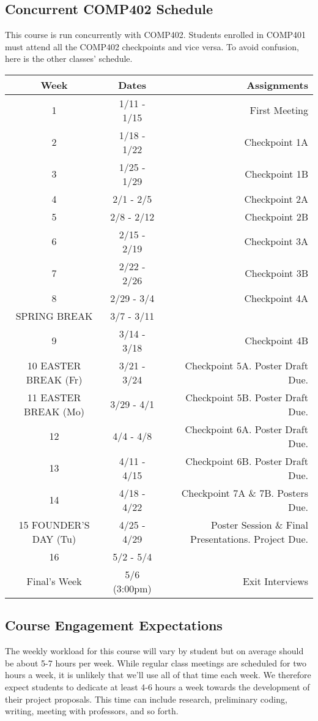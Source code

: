 \documentclass[10pt]{article}
\begin{document}
\subsection{Concurrent COMP402 Schedule}

This course is run concurrently with COMP402. Students enrolled in COMP401 must attend all the COMP402 checkpoints and vice versa. To avoid confusion, here is the other classes' schedule.

\begin{center}
\begin{tabular}{|c|c|r|}
\hline 
Week & Dates & Assignments \\
\hline
1 & 1/11 - 1/15 &  First Meeting\\
\hline
2 & 1/18 - 1/22 & Checkpoint 1A \\
\hline
3 & 1/25 - 1/29 & Checkpoint 1B  \\
\hline
4 & 2/1 - 2/5 & Checkpoint 2A  \\
\hline
5 & 2/8 - 2/12 & Checkpoint 2B  \\
\hline
6 & 2/15 - 2/19 & Checkpoint 3A \\
\hline
7 & 2/22 - 2/26 & Checkpoint 3B  \\
\hline
8 & 2/29 - 3/4 &  Checkpoint 4A  \\
\hline 
SPRING BREAK & 3/7 - 3/11 &  \\
\hline
9 & 3/14 - 3/18 & Checkpoint 4B \\
\hline
10 EASTER BREAK (Fr)& 3/21 - 3/24 & Checkpoint 5A. Poster Draft Due.\\
\hline
11 EASTER BREAK (Mo)& 3/29 - 4/1 &  Checkpoint 5B. Poster Draft Due. \\
\hline
12 & 4/4 - 4/8 & Checkpoint 6A. Poster Draft Due. \\
\hline
13 & 4/11 - 4/15 &  Checkpoint 6B. Poster Draft Due.  \\
\hline
14 & 4/18 - 4/22 &  Checkpoint 7A \& 7B. Posters Due. \\
\hline
15 FOUNDER'S DAY (Tu) & 4/25 - 4/29 & Poster Session \& Final Presentations. Project Due.\\ 
\hline
16 & 5/2 - 5/4 & \\
\hline
Final's Week & 5/6 (3:00pm) & Exit Interviews \\ 
\hline
\end{tabular}
\end{center}


\subsection{Course Engagement Expectations}

The weekly workload for this course will vary by student but on average should be about 5-7 hours per week.  While regular class meetings are scheduled for two hours a week, it is unlikely that we'll use all of that time each week.  We therefore expect students to dedicate at least 4-6 hours a week towards the development of their project proposals.  This time can include research, preliminary coding, writing, meeting with professors, and so forth.
\end{document}
